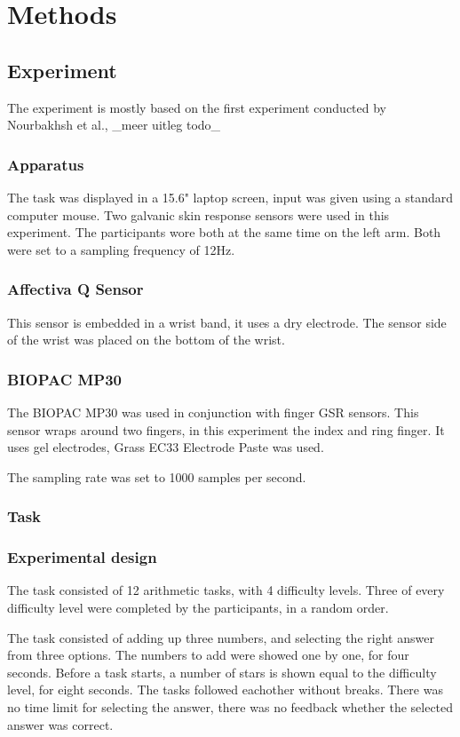 \documentclass[12pt,fleqn,leqno,letterpaper]{article}
\begin{document}
\section{Methods}

\subsection{Experiment}
The experiment is mostly based on the first experiment conducted by Nourbakhsh et al., \_meer uitleg todo\_
\subsubsection{Apparatus}
The task was displayed in a 15.6" laptop screen, input was given using a standard computer mouse.
Two galvanic skin response sensors were used in this experiment. The participants wore both at the same time on the left arm. Both were set to a sampling frequency of 12Hz. 

\subsubsection{Affectiva Q Sensor}
This sensor is embedded in a wrist band, it uses a dry electrode. The sensor side of the wrist was placed on the bottom of the wrist.

\subsubsection{BIOPAC MP30}
The BIOPAC MP30 was used in conjunction with finger GSR sensors. This sensor wraps around two fingers, in this experiment the index and ring finger. It uses gel electrodes, Grass EC33 Electrode Paste was used.

The sampling rate was set to 1000 samples per second.

\subsubsection{Task}

\subsubsection{Experimental design}
The task consisted of 12 arithmetic tasks, with 4 difficulty levels. Three of every difficulty level were completed by the participants, in a random order. 

The task consisted of adding up three numbers, and selecting the right answer from three options. The numbers to add were showed one by one, for four seconds. Before a task starts, a number of stars is shown equal to the difficulty level, for eight seconds. The tasks followed eachother without breaks. There was no time limit for selecting the answer, there was no feedback whether the selected answer was correct.
\end{document}
